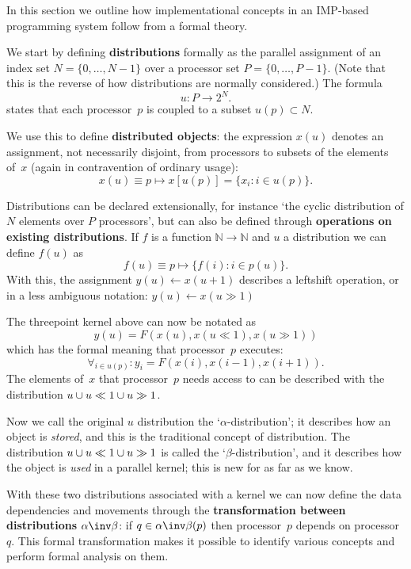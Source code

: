 In this section we outline how implementational concepts in an \ac{IMP}-based
programming system follow from a formal theory.

We start by defining \textbf{distributions} formally as
the parallel assignment of an index set $N=\{0,\ldots,N-1\}$ 
over a processor set $P=\{0,\ldots,P-1\}$. (Note that this
is the reverse of how distributions are normally considered.)
The formula
\begin{equation}
  u\colon P\rightarrow 2^N.
\end{equation}
states that each processor~$p$ is coupled to a subset $u(p)\subset N$.

We use this to define \textbf{distributed objects}: the expression $x(u)$
denotes an assignment, not necessarily disjoint,
from processors to subsets of the elements of~$x$
(again in contravention of ordinary usage):
\[ x(u)\equiv p\mapsto x[u(p)] = \{x_i\colon i\in u(p)\}. \]

Distributions can be declared extensionally,
for instance `the cyclic distribution of
$N$ elements over $P$ processors', but can also be defined
through \textbf{operations on existing distributions}.
If 
$f$ is a function $\mathbb{N}\rightarrow \mathbb{N}$
and $u$ a distribution we can define $f(u)$ as
\[ f(u)\equiv p\mapsto \{ f(i)\colon i\in p(u) \}. \]
With this, the assignment $y(u)\leftarrow x(u+1)$ 
describes a leftshift operation, or in a less ambiguous notation:
$y(u)\leftarrow x(u\gg1)$ 

The threepoint kernel above can now be notated as
\[ y(u) = F(x(u),x(u\ll1),x(u\gg1)) \]
which has the formal meaning that processor~$p$ executes:
\[ \forall_{i\in u(p)}\colon y_i=F(x(i),x(i-1),x(i+1)). \]
The elements of~$x$ that processor~$p$ needs access to can 
be described with the distribution $u\cup\penalty0 u\ll1 \cup\penalty0 u\gg1$.

Now we call the original $u$ distribution the `$\alpha$-distribution';
it describes how an object is \emph{stored}, and this is the traditional concept
of distribution. The distribution $u\cup\penalty0 u\ll1 \cup\penalty0 u\gg1$ is
called the `$\beta$-distribution', and it describes how the object 
is \emph{used} in a parallel kernel; this is new for as far as we know.

With these two distributions associated with a kernel
we can now define the data dependencies and movements
through the \textbf{transformation between distributions} $\alpha\inv\beta$:
if $q\in \alpha\inv\beta(p)$
then processor~$p$ depends on processor~$q$.
This formal transformation makes it possible to identify 
various concepts and perform formal analysis on them.

